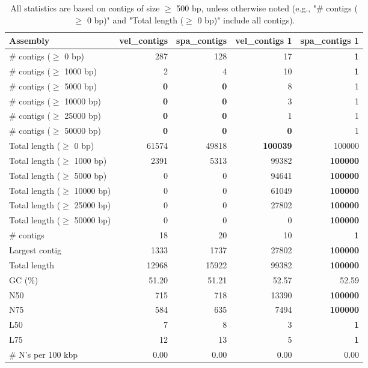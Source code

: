 \documentclass[12pt,a4paper]{article}
\begin{document}
\begin{table}[ht]
\begin{center}
\caption{All statistics are based on contigs of size $\geq$ 500 bp, unless otherwise noted (e.g., "\# contigs ($\geq$ 0 bp)" and "Total length ($\geq$ 0 bp)" include all contigs).}
\begin{tabular}{|l*{4}{|r}|}
\hline
Assembly & vel\_contigs & spa\_contigs & vel\_contigs 1 & spa\_contigs 1 \\ \hline
\# contigs ($\geq$ 0 bp) & 287 & 128 & 17 & {\bf 1} \\ \hline
\# contigs ($\geq$ 1000 bp) & 2 & 4 & 10 & {\bf 1} \\ \hline
\# contigs ($\geq$ 5000 bp) & {\bf 0} & {\bf 0} & 8 & 1 \\ \hline
\# contigs ($\geq$ 10000 bp) & {\bf 0} & {\bf 0} & 3 & 1 \\ \hline
\# contigs ($\geq$ 25000 bp) & {\bf 0} & {\bf 0} & 1 & 1 \\ \hline
\# contigs ($\geq$ 50000 bp) & {\bf 0} & {\bf 0} & {\bf 0} & 1 \\ \hline
Total length ($\geq$ 0 bp) & 61574 & 49818 & {\bf 100039} & 100000 \\ \hline
Total length ($\geq$ 1000 bp) & 2391 & 5313 & 99382 & {\bf 100000} \\ \hline
Total length ($\geq$ 5000 bp) & 0 & 0 & 94641 & {\bf 100000} \\ \hline
Total length ($\geq$ 10000 bp) & 0 & 0 & 61049 & {\bf 100000} \\ \hline
Total length ($\geq$ 25000 bp) & 0 & 0 & 27802 & {\bf 100000} \\ \hline
Total length ($\geq$ 50000 bp) & 0 & 0 & 0 & {\bf 100000} \\ \hline
\# contigs & 18 & 20 & 10 & {\bf 1} \\ \hline
Largest contig & 1333 & 1737 & 27802 & {\bf 100000} \\ \hline
Total length & 12968 & 15922 & 99382 & {\bf 100000} \\ \hline
GC (\%) & 51.20 & 51.21 & 52.57 & 52.59 \\ \hline
N50 & 715 & 718 & 13390 & {\bf 100000} \\ \hline
N75 & 584 & 635 & 7494 & {\bf 100000} \\ \hline
L50 & 7 & 8 & 3 & {\bf 1} \\ \hline
L75 & 12 & 13 & 5 & {\bf 1} \\ \hline
\# N's per 100 kbp & 0.00 & 0.00 & 0.00 & 0.00 \\ \hline
\end{tabular}
\end{center}
\end{table}
\end{document}
